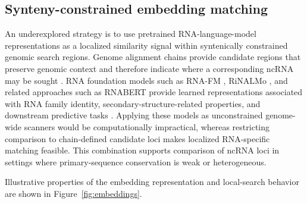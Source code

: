 \subsection{Synteny-constrained embedding matching}

An underexplored strategy is to use pretrained RNA-language-model
representations as a localized similarity signal within syntenically constrained
genomic search regions. Genome alignment chains provide candidate regions that
preserve genomic context and therefore indicate where a corresponding ncRNA may
be sought
\citep{zoonomiaconsortiumComparativeGenomicsMultitool2020,
  armstrongProgressiveCactusMultiplegenome2020}.
RNA foundation models such as RNA-FM
\citep{chenInterpretableRNAFoundation2022}, RiNALMo
\citep{penicRiNALMoGeneralpurposeRNA2025}, and related approaches such as RNABERT
\citep{akiyamaInformativeRNABase2022} provide learned representations associated
with RNA family identity, secondary-structure-related properties, and downstream
predictive tasks
\citep{vahabAdvancingNoncodingRNA2025}.
Applying these models as unconstrained genome-wide scanners would be
computationally impractical, whereas restricting comparison to chain-defined
candidate loci makes localized RNA-specific matching feasible. This combination
supports comparison of ncRNA loci in settings where primary-sequence conservation
is weak or heterogeneous.

Illustrative properties of the embedding representation and local-search
behavior are shown in Figure~\ref{fig:embeddings}.

